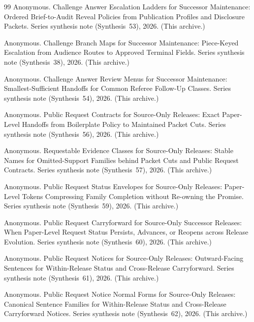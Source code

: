 \documentclass[11pt]{article}
\begin{document}
\begin{thebibliography}{99}
Anonymous.
\newblock Challenge Answer Escalation Ladders for Successor Maintenance: Ordered Brief-to-Audit Reveal Policies from Publication Profiles and Disclosure Packets.
\newblock Series synthesis note (Synthesis~53), 2026. (This archive.)

Anonymous.
\newblock Challenge Branch Maps for Successor Maintenance: Piece-Keyed Escalation from Audience Routes to Approved Terminal Fields.
\newblock Series synthesis note (Synthesis~38), 2026. (This archive.)

Anonymous.
\newblock Challenge Answer Review Menus for Successor Maintenance: Smallest-Sufficient Handoffs for Common Referee Follow-Up Classes.
\newblock Series synthesis note (Synthesis~54), 2026. (This archive.)

Anonymous.
\newblock Public Request Contracts for Source-Only Releases: Exact Paper-Level Handoffs from Boilerplate Policy to Maintained Packet Cuts.
\newblock Series synthesis note (Synthesis~56), 2026. (This archive.)

Anonymous.
\newblock Requestable Evidence Classes for Source-Only Releases: Stable Names for Omitted-Support Families behind Packet Cuts and Public Request Contracts.
\newblock Series synthesis note (Synthesis~57), 2026. (This archive.)


Anonymous.
\newblock Public Request Status Envelopes for Source-Only Releases: Paper-Level Tokens Compressing Family Completion without Re-owning the Promise.
\newblock Series synthesis note (Synthesis~59), 2026. (This archive.)

Anonymous.
\newblock Public Request Carryforward for Source-Only Successor Releases: When Paper-Level Request Status Persists, Advances, or Reopens across Release Evolution.
\newblock Series synthesis note (Synthesis~60), 2026. (This archive.)

Anonymous.
\newblock Public Request Notices for Source-Only Releases: Outward-Facing Sentences for Within-Release Status and Cross-Release Carryforward.
\newblock Series synthesis note (Synthesis~61), 2026. (This archive.)

Anonymous.
\newblock Public Request Notice Normal Forms for Source-Only Releases: Canonical Sentence Families for Within-Release Status and Cross-Release Carryforward Notices.
\newblock Series synthesis note (Synthesis~62), 2026. (This archive.)


\end{thebibliography}
\end{document}
